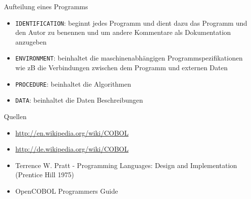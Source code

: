 \documentclass{beamer}
\begin{document}
\begin{frame}{Aufteilung eines Programms}
	\begin{itemize}
		\item
			\texttt{IDENTIFICATION}: beginnt jedes Programm und dient dazu das Programm und den Autor zu benennen und um andere Kommentare als Dokumentation anzugeben
		\item
			\texttt{ENVIRONMENT}: beinhaltet die maschinenabhängigen Programmspezifikationen wie zB die Verbindungen zwischen dem Programm und externen Daten
		\item
			\texttt{PROCEDURE}: beinhaltet die Algorithmen
		\item
			\texttt{DATA}: beinhaltet die Daten Beschreibungen
	\end{itemize}
\end{frame}

\begin{frame}{Quellen}
	\begin{itemize}
		\item
			\url{http://en.wikipedia.org/wiki/COBOL}
		\item
			\url{http://de.wikipedia.org/wiki/COBOL}
		\item
			Terrence W. Pratt - Programming Languages: Design and Implementation (Prentice Hill 1975)
		\item OpenCOBOL Programmers Guide
	\end{itemize}
\end{frame}
\end{document}
